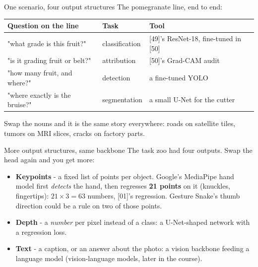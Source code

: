 \documentclass[aspectratio=169]{beamer}
\begin{document}
\begin{frame}{One scenario, four output structures}
  The pomegranate line, end to end:
  \vskip 4pt
  \begin{center}\small
    \begin{tabular}{l l l}
      \textbf{Question on the line} & \textbf{Task} & \textbf{Tool}\\
      \hline
      "what grade is this fruit?" & classification & [49]'s ResNet-18, fine-tuned in [50]\\
      "is it grading fruit or belt?" & attribution & [50]'s Grad-CAM audit\\
      "how many fruit, and where?" & detection & a fine-tuned YOLO\\
      "where exactly is the bruise?" & segmentation & a small U-Net for the cutter\\
    \end{tabular}
  \end{center}
  \vskip 6pt
  Swap the nouns and it is the same story everywhere: roads on satellite tiles, tumors
  on MRI slices, cracks on factory parts.
  \vskip 4pt
\end{frame}

\begin{frame}{More output structures, same backbone}
  The task zoo had four outputs. Swap the head again and you get more:
  \vskip 4pt
  \begin{itemize}\setlength\itemsep{4pt}
    \item \textbf{Keypoints} - a fixed list of points per object. Google's MediaPipe hand
      model first \emph{detects} the hand, then regresses \textbf{21 points} on it
      (knuckles, fingertips): $21 \times 3 = 63$ numbers, [01]'s regression. Gesture Snake's
      thumb direction could be a rule on two of those points.
    \item \textbf{Depth} - a \emph{number} per pixel instead of a class: a U-Net-shaped
      network with a regression loss.
    \item \textbf{Text} - a caption, or an answer about the photo: a vision backbone feeding a
      language model (vision-language models, later in the course).
  \end{itemize}
  \vskip 6pt
\end{frame}
\end{document}
